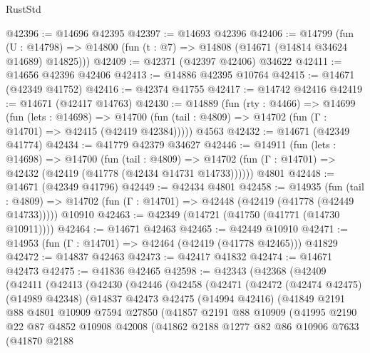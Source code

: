 \begin{lexlean}{RustStd}
\begin{coremodule}
@42396 := @14696 @42395
@42397 := @14693 @42396
@42406 := @14799
    (fun (U : @14798) => @14800 (fun (t : @7) => @14808 (@14671 (@14814 @34624 @14689) @14825)))
@42409 := @42371 (@42397 @42406) @34622
@42411 := @14656 @42396 @42406
@42413 := @14886 @42395 @10764
@42415 := @14671 (@42349 @41752)
@42416 := @42374 @41755
@42417 := @14742 @42416
@42419 := @14671 (@42417 @14763)
@42430 := @14889
    (fun (rty : @4466) =>
    @14699
      (fun (lets : @14698) =>
      @14700 (fun (tail : @4809) => @14702 (fun (Γ : @14701) => @42415 (@42419 @42384)))))
    @4563
@42432 := @14671 (@42349 @41774)
@42434 := @41779 @42379 @34627
@42446 := @14911
    (fun (lets : @14698) =>
    @14700
      (fun (tail : @4809) =>
      @14702 (fun (Γ : @14701) => @42432 (@42419 (@41778 (@42434 @14731 @14733))))))
    @4801
@42448 := @14671 (@42349 @41796)
@42449 := @42434 @4801
@42458 := @14935
    (fun (tail : @4809) => @14702 (fun (Γ : @14701) => @42448 (@42419 (@41778 (@42449 @14733)))))
    @10910
@42463 := @42349 (@14721 (@41750 (@41771 (@14730 @10911))))
@42464 := @14671 @42463
@42465 := @42449 @10910
@42471 := @14953 (fun (Γ : @14701) => @42464 (@42419 (@41778 @42465))) @41829
@42472 := @14837 @42463
@42473 := @42417 @41832
@42474 := @14671 @42473
@42475 := @41836 @42465
@42598 := @42343
    (@42368
      (@42409
        (@42411
          (@42413
            (@42430
              (@42446
                (@42458
                  (@42471
                    (@42472
                      (@42474 @42475)
                      (@14989 @42348)
                      (@14837
                        @42473
                        @42475
                        (@14994 @42416)
                        (@41849
                          @2191
                          @88
                          @4801
                          @10909
                          @7594
                          @27850
                          (@41857
                            @2191
                            @88
                            @10909
                            (@41995
                              @2190
                              @22
                              @87
                              @4852
                              @10908
                              @42008
                              (@41862
                                @2188
                                @1277
                                @82
                                @86
                                @10906
                                @7633
                                (@41870
                                  @2188

\end{coremodule}
\end{lexlean}
